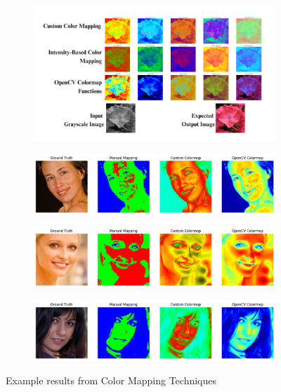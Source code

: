 \documentclass[conference]{IEEEtran}
\begin{document}
\begin{figure}[t]
    \centering
    \begin{subfigure}[b]{\linewidth}
        \centering
        \includegraphics[width=\linewidth]{classical_techniques.png}
        \label{fig:classical_techniques}
    \end{subfigure}
    \hfill
    \begin{subfigure}[b]{\linewidth}
        \centering
        \includegraphics[width=\linewidth]{colormap1.jpg}
        \label{fig:colormap1}
    \end{subfigure}
    \vspace{0.3cm} %
    \begin{subfigure}[b]{\linewidth}
        \centering
        \includegraphics[width=\linewidth]{colormap2.jpg}
        \label{fig:colormap2}
    \end{subfigure}
    \hfill
    \begin{subfigure}[b]{\linewidth}
        \centering
        \includegraphics[width=\linewidth]{colormap3.jpg}
        \label{fig:colormap3}
    \end{subfigure} 
    \caption{Example results from Color Mapping Techniques}
    \label{fig:color_mapping_results}
\end{figure}
\end{document}
